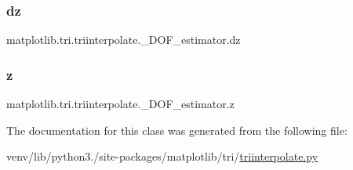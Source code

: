 \subsubsection{\texorpdfstring{dz}{dz}}
{\footnotesize\ttfamily matplotlib.\+tri.\+triinterpolate.\+\_\+\+D\+O\+F\+\_\+estimator.\+dz}

\mbox{\label{classmatplotlib_1_1tri_1_1triinterpolate_1_1__DOF__estimator_af4538d8f14141b5652b804ae343e7af0}} 
\subsubsection{\texorpdfstring{z}{z}}
{\footnotesize\ttfamily matplotlib.\+tri.\+triinterpolate.\+\_\+\+D\+O\+F\+\_\+estimator.\+z}



The documentation for this class was generated from the following file\+:\begin{DoxyCompactItemize}
\item 
venv/lib/python3./site-\/packages/matplotlib/tri/\hyperlink{triinterpolate_8py}{triinterpolate.\+py}\end{DoxyCompactItemize}
